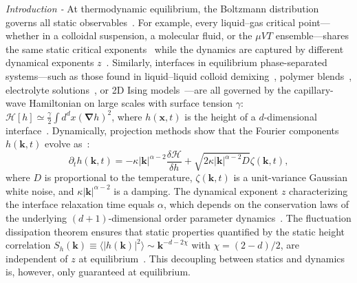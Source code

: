 \documentclass[aps,
reprint,
superscriptaddress,









amsmath,amssymb,floatfix,






prl
]{revtex4-2}
\begin{document}
\emph{Introduction -} At thermodynamic equilibrium, the Boltzmann distribution governs all static observables~\cite{kardar2007statistical}. For example, every liquid–gas critical point---whether in a colloidal suspension, a molecular fluid, or the $\mu VT$ ensemble---shares the same static critical exponents~\cite{goldenfeld2018lectures} while the dynamics are captured by different dynamical exponents $z$~\cite{mazenko2006nonequilibrium,tauber2014critical}. Similarly, interfaces in equilibrium phase-separated systems---such as those found in liquid–liquid colloid demixing~\cite{aarts2004direct}, polymer blends~\cite{langevin2021light}, electrolyte solutions~\cite{safouane2009surface}, or 2D Ising models~\cite{gallavotti1972phase}---are all governed by the capillary-wave Hamiltonian on large scales with surface tension $\gamma$: $\mathcal{H}[h] \simeq \frac{\gamma}{2} \int d^d x \left( \bm{\nabla} h \right)^2$, where $h(\bm{x}, t)$ is the height of a $d$-dimensional interface~\cite{onuki2002phase}.  Dynamically, projection methods show that the Fourier components $h(\bm{k}, t)$ evolve as~\cite{onuki2002phase,kawasaki1982kinetic, slavchov2021characterization, bray2001interface, bausch1981critical, zia1985normal, zia1988dynamics, Romano_Golestanian_Mahault_2025, caballero2020bulk}:
\begin{equation}
\partial_t h(\bm{k}, t) = -\kappa |\bm{k}|^{\alpha-2}\dfrac{\delta \mathcal H}{\delta h} + \sqrt{2\kappa |\bm{k}|^{\alpha-2}D} \zeta(\bm{k}, t),
\label{eq: dynamics equilibrium}
\end{equation}
where $D$ is proportional to the temperature, $\zeta(\bm{k}, t)$ is a unit-variance Gaussian white noise, and $\kappa |\bm k|^{\alpha-2}$ is a damping. The dynamical exponent $z$ characterizing the interface relaxation time equals $\alpha$, which depends on the conservation laws of the underlying $(d+1)$-dimensional order parameter dynamics~\cite{bray2001interface}. The fluctuation dissipation theorem ensures that static properties quantified by the static height correlation $S_h(\bm k)\equiv \langle |h(\bm k)|^2\rangle\sim \bm k^{-d-2\chi}$ with $\chi = (2-d)/2$, are independent of $z$ at equilibrium~\cite{onuki2002phase}. This decoupling between statics and dynamics is, however, only guaranteed at equilibrium.
\end{document}

